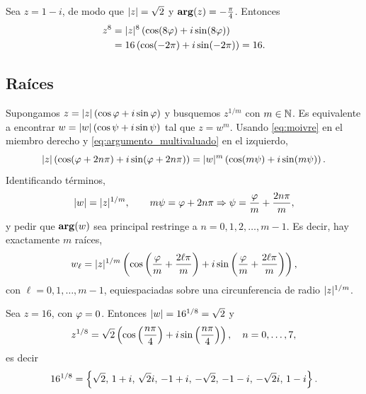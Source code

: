 \begin{ejemplo}
  \label{ej:potencia_octava}
  Sea $z=1-i$, de modo que $\lvert z \rvert=\sqrt{2}$ y
  $\operatorname{\mathbf{arg}}(z)=-\tfrac{\pi}{4}$. Entonces
  \begin{equation}
    \label{eq:potencia_octava}
    \begin{aligned}
      z^8&=\lvert z \rvert^8\left( \cos(8\varphi)+i\sin(8\varphi) \right)\\
         &=16\left( \cos(-2\pi)+i\sin(-2\pi) \right)=16 .
    \end{aligned}
  \end{equation}
\end{ejemplo}

\subsection{Ra\'ices}
\label{subsec:raices}

Supongamos $z=\lvert z \rvert\left( \cos\varphi+i\sin\varphi \right)$ y busquemos $z^{1/m}$ con
$m\in\mathbb{N}$. Es equivalente a encontrar $w=\lvert w \rvert\left( \cos\psi+i\sin\psi \right)$ tal que
$z=w^m$. Usando \eqref{eq:moivre} en el miembro derecho y
\eqref{eq:argumento_multivaluado} en el izquierdo,
\begin{equation}
  \label{eq:raiz_igualdad}
  \small
  \lvert z \rvert\left( \cos(\varphi+2n\pi)+i\sin(\varphi+2n\pi) \right)
    =\lvert w \rvert^m\left( \cos(m\psi)+i\sin(m\psi) \right) .
\end{equation}
Identificando t\'erminos,
\begin{equation}
  \label{eq:raiz_identificacion}
  \lvert w \rvert=\lvert z \rvert^{1/m},
  \qquad
  m\psi=\varphi+2n\pi
  \Rightarrow
  \psi=\frac{\varphi}{m}+\frac{2n\pi}{m},
\end{equation}
y pedir que $\operatorname{\mathbf{arg}}(w)$ sea principal restringe a
$n=0,1,2,\dots,m-1$. Es decir, hay exactamente $m$ ra\'ices,
\begin{equation}
  \label{eq:raices_m}
  \small
  w_{\ell}=\lvert z \rvert^{1/m}
    \left( \cos\left( \frac{\varphi}{m}+\frac{2\ell\pi}{m} \right)
        +i\sin\left( \frac{\varphi}{m}+\frac{2\ell\pi}{m} \right) \right),
\end{equation}
con $\ell=0,1,\dots,m-1$, equiespaciadas sobre una circunferencia de radio
$\lvert z \rvert^{1/m}$.

\begin{ejemplo}
  \label{ej:raiz_octava}
  Sea $z=16$, con $\varphi=0$. Entonces $\lvert w \rvert=16^{1/8}=\sqrt{2}$ y
  \begin{equation}
    \label{eq:raiz_octava}
    z^{1/8}=\sqrt{2}\left( \cos\left( \frac{n\pi}{4} \right)
      +i\sin\left( \frac{n\pi}{4} \right) \right),
    \quad n=0,\dots,7,
  \end{equation}
  es decir
  \begin{equation}
    \label{eq:raices_16}
    \small
    16^{1/8}=\left\{ \sqrt{2},\,1+i,\,\sqrt{2}i,\,-1+i,\,
      -\sqrt{2},\,-1-i,\,-\sqrt{2}i,\,1-i \right\} .
  \end{equation}
\end{ejemplo}

